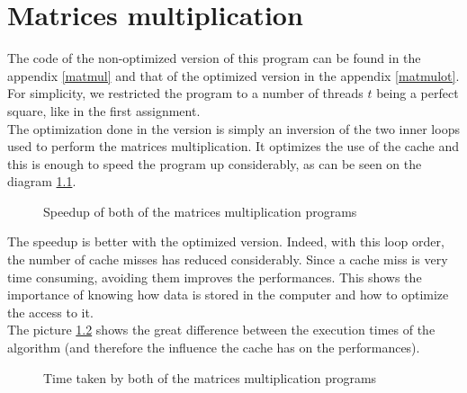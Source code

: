 \chapter{Matrices multiplication}

The code of the non-optimized version of this program can be found in the appendix \ref{matmul} and that of the optimized version in the appendix \ref{matmulot}. For simplicity, we restricted the program to a number of threads $t$ being a perfect square, like in the first assignment.\\
 
The optimization done in the version is simply an inversion of the two inner loops used to perform the matrices multiplication. It optimizes the use of the cache and this is enough to speed the program up considerably, as can be seen on the diagram \ref{matmul_pic}.

\begin{figure}[h]
  \begin{center}
  \end{center}
  \caption{Speedup of both of the matrices multiplication programs}
  \label{matmul_pic}
\end{figure}

The speedup is better with the optimized version. Indeed, with this loop order, the number of cache misses has reduced considerably. Since a cache miss is very time consuming, avoiding them improves the performances. This shows the importance of knowing how data is stored in the computer and how to optimize the access to it.\\

The picture \ref{matmul_time} shows the great difference between the execution times of the algorithm (and therefore the influence the cache has on the performances).

\begin{figure}[h]
  \begin{center}
  \end{center}
  \caption{Time taken by both of the matrices multiplication programs}
  \label{matmul_time}
\end{figure}


